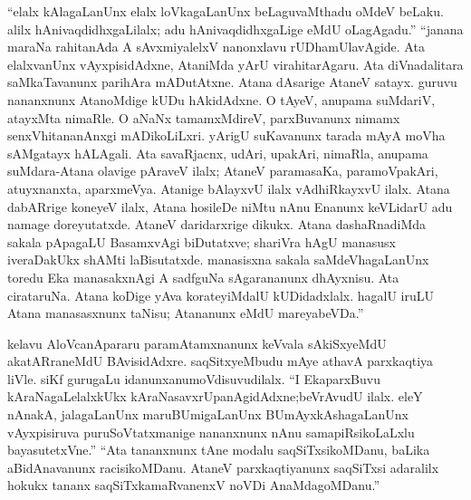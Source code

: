 ``elalx kAlagaLanUnx elalx loVkagaLanUnx beLaguvaMthadu oMdeV beLaku. alilx hAnivaqdidhxgaLilalx; adu hAnivaqdidhxgaLige eMdU oLagAgadu.'' ``janana maraNa rahitanAda A sAvxmiyalelxV nanonxlavu rUDhamUlavAgide. Ata elalxvanUnx vAyxpisidAdxne, AtaniMda yArU virahitarAgaru. Ata diVnadalitara saMkaTavanunx parihAra mADutAtxne. Atana dAsarige AtaneV satayx. guruvu nananxnunx AtanoMdige kUDu hAkidAdxne. O tAyeV, anupama suMdariV, atayxMta nimaRle. O aNaNx tamamxMdireV, parxBuvanunx nimamx senxVhitananAnxgi mADikoLiLxri. yArigU suKavanunx tarada mAyA moVha sAMgatayx hALAgali. Ata savaRjacnx, udAri, upakAri, nimaRla, anupama suMdara-Atana olavige pAraveV ilalx; AtaneV paramasaKa, paramoVpakAri, atuyxnanxta, aparxmeVya. Atanige bAlayxvU ilalx vAdhiRkayxvU ilalx. Atana dabARrige koneyeV ilalx, Atana hosileDe niMtu nAnu Enanunx keVLidarU adu namage doreyutatxde. AtaneV daridarxrige dikukx. Atana dashaRnadiMda sakala pApagaLU BasamxvAgi biDutatxve; shariVra hAgU manasusx iveraDakUkx shAMti laBisutatxde. manasisxna sakala saMdeVhagaLanUnx toredu Eka manasakxnAgi A sadfguNa sAgarananunx dhAyxnisu. Ata cirataruNa. Atana koDige yAva korateyiMdalU kUDidadxlalx. hagalU iruLU Atana manasasxnunx taNisu; Atananunx eMdU mareyabeVDa.''

kelavu AloVcanApararu paramAtamxnanunx keVvala sAkiSxyeMdU akatARraneMdU BAvisidAdxre. saqSitxyeMbudu mAye athavA parxkaqtiya liVle. siKf gurugaLu \hbox{idanunx}\break anumoVdisuvudilalx. ``I EkaparxBuvu kAraNagaLelalxkUkx kAraNasavxrUpanAgidAdxne;\break beVrAvudU ilalx. eleY nAnakA, jalagaLanUnx maruBUmigaLanUnx BUmAyxkAsha\-gaLanUnx vAyxpisiruva puruSoVtatxmanige nananxnunx nAnu samapiRsikoLaLxlu bayasutetxVne.'' ``Ata tananxnunx tAne modalu saqSiTxsikoMDanu, baLika aBidAnavanunx racisikoMDanu. AtaneV parxkaqtiyanunx saqSiTxsi adaralilx hokukx tananx saqSiTxkamaRvanenxV noVDi AnaMdagoMDanu.''

